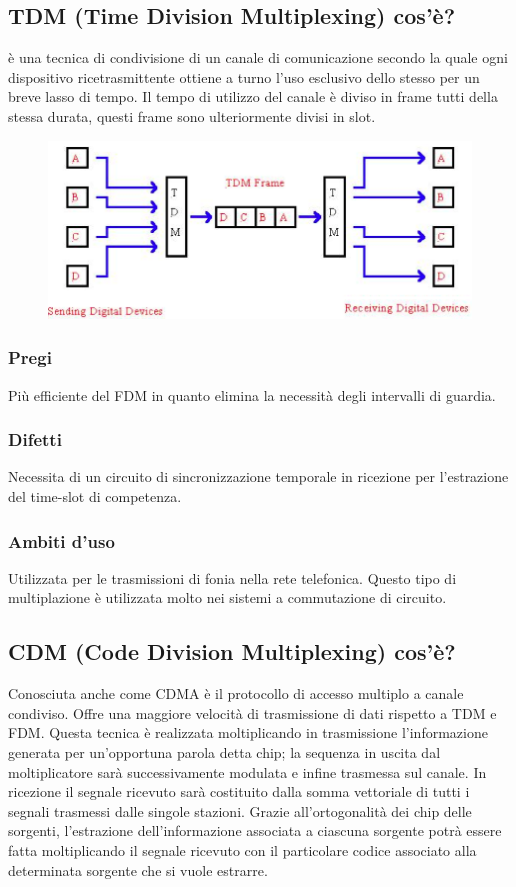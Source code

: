 \subsection{TDM (Time Division Multiplexing) cos'è?}
è una tecnica di condivisione di un canale di comunicazione secondo la quale ogni dispositivo ricetrasmittente ottiene a turno l'uso esclusivo dello stesso per un breve lasso di tempo. Il tempo di utilizzo del canale è diviso in frame tutti della stessa durata, questi frame sono ulteriormente divisi in slot.

\begin{figure}[H]
\centering
\includegraphics[scale=0.5]{res/img/11_TDM.png}
\end{figure} 

\subsubsection{Pregi}
Più efficiente del FDM in quanto elimina la necessità degli intervalli di guardia.

\subsubsection{Difetti}
Necessita di un circuito di sincronizzazione temporale in ricezione per l'estrazione del time-slot di competenza.

\subsubsection{Ambiti d'uso}
Utilizzata per le trasmissioni di fonia nella rete telefonica. Questo tipo di multiplazione è utilizzata molto nei sistemi a commutazione di circuito.

\subsection{CDM (Code Division Multiplexing) cos'è?}
Conosciuta anche come CDMA è il protocollo di accesso multiplo a canale condiviso. Offre una maggiore velocità di trasmissione di dati rispetto a TDM e FDM.
Questa tecnica è realizzata moltiplicando in trasmissione l'informazione generata per un'opportuna parola detta chip; la sequenza in uscita dal moltiplicatore sarà successivamente modulata e infine trasmessa sul canale.
In ricezione il segnale ricevuto sarà costituito dalla somma vettoriale di tutti i segnali trasmessi dalle singole stazioni. Grazie all'ortogonalità dei chip delle sorgenti, l'estrazione dell'informazione associata a ciascuna sorgente potrà essere fatta moltiplicando il segnale ricevuto con il particolare codice associato alla determinata sorgente che si vuole estrarre.


